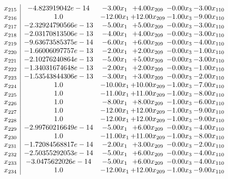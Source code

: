 \documentclass[8pt]{article}
\begin{document}
\[\begin{array}{c| c c@{\hskip 2pt} c@{\hskip 2pt} c@{\hskip 2pt} c@{\hskip 2pt} }
 x_{215}   &  -4.823919042e-14 & -3.00 x_{1} & +  4.00 x_{209} & -0.00 x_{3} & -3.00 x_{110}\\
 x_{216}   &  1.0 & -12.00 x_{1} & + 12.00 x_{209} & -1.00 x_{3} & -9.00 x_{110}\\
 x_{217}   &  -2.32924790566e-13 & -5.00 x_{1} & +  5.00 x_{209} & -0.00 x_{3} & -3.00 x_{110}\\
 x_{218}   &  -2.03170813506e-13 & -4.00 x_{1} & +  4.00 x_{209} & -0.00 x_{3} & -3.00 x_{110}\\
 x_{219}   &  -9.63673585375e-14 & -6.00 x_{1} & +  6.00 x_{209} & -0.00 x_{3} & -4.00 x_{110}\\
 x_{220}   &  -1.66006097757e-13 & -2.00 x_{1} & +  2.00 x_{209} & -0.00 x_{3} & -1.00 x_{110}\\
 x_{221}   &  -2.10276240864e-13 & -5.00 x_{1} & +  5.00 x_{209} & -0.00 x_{3} & -3.00 x_{110}\\
 x_{222}   &  -1.34031674648e-13 & -2.00 x_{1} & +  2.00 x_{209} & -0.00 x_{3} & -1.00 x_{110}\\
 x_{223}   &  -1.53543844306e-13 & -3.00 x_{1} & +  3.00 x_{209} & -0.00 x_{3} & -2.00 x_{110}\\
 x_{224}   &  1.0 & -10.00 x_{1} & + 10.00 x_{209} & -1.00 x_{3} & -7.00 x_{110}\\
 x_{225}   &  1.0 & -11.00 x_{1} & + 11.00 x_{209} & -1.00 x_{3} & -8.00 x_{110}\\
 x_{226}   &  1.0 & -8.00 x_{1} & +  8.00 x_{209} & -1.00 x_{3} & -6.00 x_{110}\\
 x_{227}   &  1.0 & -12.00 x_{1} & + 12.00 x_{209} & -1.00 x_{3} & -9.00 x_{110}\\
 x_{228}   &  1.0 & -12.00 x_{1} & + 12.00 x_{209} & -1.00 x_{3} & -9.00 x_{110}\\
 x_{229}   &  -2.99760216649e-14 & -5.00 x_{1} & +  6.00 x_{209} & -0.00 x_{3} & -4.00 x_{110}\\
 x_{230}   &  1.0 & -11.00 x_{1} & + 11.00 x_{209} & -1.00 x_{3} & -8.00 x_{110}\\
 x_{231}   &  -1.72084568817e-14 & -2.00 x_{1} & +  3.00 x_{209} & -0.00 x_{3} & -2.00 x_{110}\\
 x_{232}   &  -2.50355292053e-14 & -5.00 x_{1} & +  6.00 x_{209} & -0.00 x_{3} & -4.00 x_{110}\\
 x_{233}   &  -3.0475622026e-14 & -5.00 x_{1} & +  6.00 x_{209} & -0.00 x_{3} & -4.00 x_{110}\\
 x_{234}   &  1.0 & -12.00 x_{1} & + 12.00 x_{209} & -1.00 x_{3} & -9.00 x_{110}\\

\end{array}\]
\end{document}
